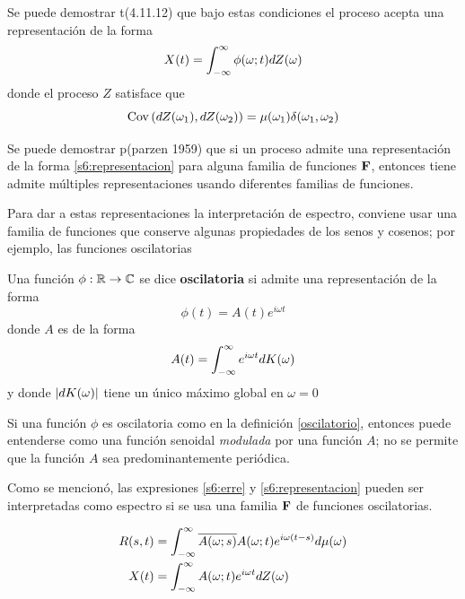 Se puede demostrar t(4.11.12) que bajo estas condiciones el proceso \xt acepta una representación de la forma 
\begin{equation}
X(t) = \int_{-\infty}^{\infty} \phi(\omega;t) dZ(\omega)
\label{s6:representacion}
\end{equation}
donde el proceso $Z$ satisface que
\begin{equation}
\mathrm{Cov}\left( dZ(\omega_1),dZ(\omega_2) \right) = \mu(\omega_1) \delta(\omega_1, \omega_2)
\end{equation}


Se puede demostrar p(parzen 1959) que si un proceso admite una representación de la forma \ref{s6:representacion} para alguna familia de funciones $\mathbf{F}$, entonces tiene admite múltiples
representaciones usando diferentes familias de funciones.
%
%

Para dar a estas representaciones la interpretación de espectro, conviene usar una familia de funciones que conserve algunas propiedades de los senos y cosenos; por ejemplo, las funciones oscilatorias

\begin{definicion}
Una función $\phi: \mathbb{R} \rightarrow \mathbb{C}$ se dice \textbf{oscilatoria} si admite una representación de la forma
\begin{equation}
\phi(t) = A(t) e^{i \omega t} 
\end{equation}
donde $A$ es de la forma
\begin{equation}
A(t) = \int_{-\infty}^{\infty} e^{i \omega t} dK(\omega)
\end{equation}
y donde $\left| dK(\omega) \right|$ tiene un único máximo global en $\omega = 0$
\label{oscilatorio}
\end{definicion}

Si una función $\phi$ es oscilatoria como en la definición \ref{oscilatorio}, entonces puede entenderse como una función senoidal \textit{modulada} por una función $A$; no se permite que la función $A$ sea predominantemente periódica.

Como se mencionó, las expresiones \ref{s6:erre} y \ref{s6:representacion} pueden ser interpretadas como espectro si se usa una familia $\mathbf{F}$ de funciones oscilatorias.

\begin{align}
R(s,t) &= \int_{-\infty}^{\infty} \overline{A(\omega; s)} A(\omega; t) e^{i\omega (t-s)} d\mu(\omega) \\
X(t) &= \int_{-\infty}^{\infty} A(\omega; t) e^{i \omega t} dZ(\omega)
\end{align}



